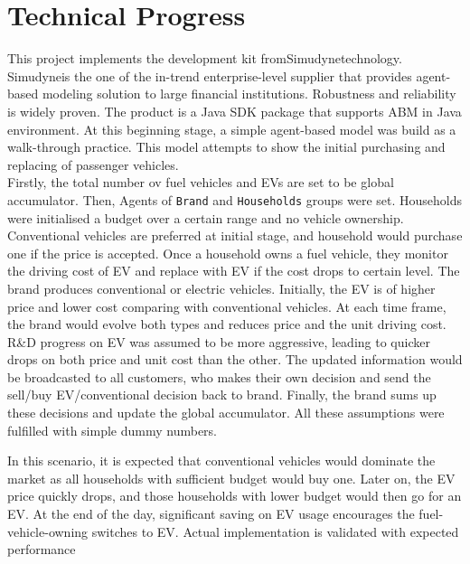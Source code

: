 \documentclass[12pt,twoside]{report}
\begin{document}
	
	
	\chapter{Technical Progress}\label{ch:technicall-progress}
	This project implements the development kit fromSimudyne\textregistered \space technology.
	Simudyne\textregistered \space is the one of the in-trend enterprise-level supplier that provides agent-based
	modeling solution to large financial institutions\cite{Simudyne}.
	Robustness and reliability is widely proven.
	The product is a Java SDK package that supports ABM in Java environment.
	At this beginning stage, a simple agent-based model was build as a walk-through practice.
	This model attempts to show the initial purchasing and replacing of passenger vehicles.\\
	
	Firstly, the total number ov fuel vehicles and EVs are set to be global accumulator.
	Then, Agents of \texttt{Brand} and \texttt{Households} groups were set.
	Households were initialised a budget over a certain range and no vehicle ownership.
	Conventional vehicles are preferred at initial stage, and household would purchase one if the price is accepted.
	Once a household owns a fuel vehicle, they monitor the driving cost of EV and replace with EV if the cost drops
	to certain level.
	The brand produces conventional or electric vehicles.
	Initially, the EV is of higher price and lower cost comparing with conventional vehicles.
	At each time frame, the brand would evolve both types and reduces price and the unit driving cost.
	R\&D progress on EV was assumed to be more aggressive, leading to quicker drops on both price and unit cost than
	the other.
	The updated information would be broadcasted to all customers, who makes their own decision and send the
	sell/buy EV/conventional decision back to brand.
	Finally, the brand sums up these decisions and update the global accumulator.
	All these assumptions were fulfilled with simple dummy numbers.\\
	\clearpage
	
	In this scenario, it is expected that conventional vehicles would dominate the market as all households with
	sufficient budget would buy one.
	Later on, the EV price quickly drops, and those households with lower budget would then go for an EV.
	At the end of the day, significant saving on EV usage encourages the fuel-vehicle-owning switches to EV.
	Actual implementation is validated with expected performance
	
\end{document}
